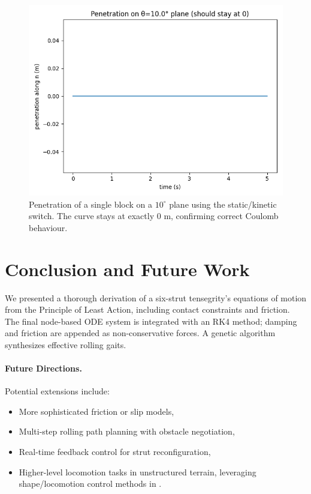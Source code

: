 \documentclass[12pt,letterpaper]{article}
\begin{document}
\begin{figure}[H]
    \centering
    \includegraphics[width=0.70\linewidth]{friction_test.png}
    \caption{Penetration of a single block on a \(10^{\circ}\) plane
      using the static/kinetic switch.  The curve stays at exactly 0 m,
      confirming correct Coulomb behaviour.}
    \label{fig:friction‑penetr}
\end{figure}

\section{Conclusion and Future Work}
We presented a thorough derivation of a six-strut tensegrity’s equations of motion from the Principle of Least Action, including contact constraints and friction.  The final node-based ODE system is integrated with an RK4 method; damping and friction are appended as non-conservative forces.  A genetic algorithm synthesizes effective rolling gaits.

\paragraph{Future Directions.}
Potential extensions include:
\begin{itemize}[leftmargin=1.8em]
 \item More sophisticated friction or slip models,
 \item Multi-step rolling path planning with obstacle negotiation,
 \item Real-time feedback control for strut reconfiguration,
 \item Higher-level locomotion tasks in unstructured terrain, leveraging shape/locomotion control methods in \cite{Cai2020}.
\end{itemize}
\end{document}
